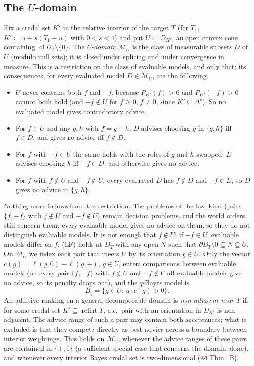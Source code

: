 \documentclass[11pt]{article}
\theoremstyle{definition}
\theoremstyle{remark}
\newcommand{\Di}{\Delta^{\circ}}
\newcommand{\M}{\mathcal M}
\newcommand{\cl}{\operatorname{cl}}
\newcommand{\relint}{\operatorname{relint}}
\newcommand{\src}[1]{\texttt{#1}}
\begin{document}
\subsection{The \texorpdfstring{$U$}{U}-domain}\label{sec:aos}
Fix a credal set $K'$ in the relative interior of the target $T$ (for $T_1$, $K'\coloneqq u+s(T_1-u)$ with $0<s<1$) and put $U\coloneqq D_{K'}$, an open convex cone containing $\cl D_T\setminus\{0\}$. The \emph{$U$-domain} $\M_U$ is the class of measurable subsets $D$ of $U$ (modulo null sets); it is closed under splicing and under convergence in measure. This is a restriction on the class of evaluable models, and only that; its consequences, for every evaluated model $D\in\M_U$, are the following.
\begin{itemize}[leftmargin=*]
\item $U$ never contains both $f$ and $-f$, because $P_{K'}(f)>0$ and $P_{K'}(-f)>0$ cannot both hold (and $-f\notin U$ for $f\ge0$, $f\ne0$, since $K'\subseteq\Di$). So no evaluated model gives contradictory advice.
\item For $f\in U$ and any $g,h$ with $f=g-h$, $D$ advises choosing $g$ in $\{g,h\}$ iff $f\in D$, and gives no advice iff $f\notin D$.
\item For $f$ with $-f\in U$ the same holds with the roles of $g$ and $h$ swapped: $D$ advises choosing $h$ iff $-f\in D$, and otherwise gives no advice.
\item For $f$ with $f\notin U$ and $-f\notin U$, every evaluated $D$ has $f\notin D$ and $-f\notin D$, so $D$ gives no advice in $\{g,h\}$.
\end{itemize}
Nothing more follows from the restriction. The problems of the last kind (pairs $\{f,-f\}$ with $f\notin U$ and $-f\notin U$) remain decision problems, and the world orders still concern them; every evaluable model gives no advice on them, so they do not distinguish evaluable models. It is not enough that $f\notin U$: if $-f\in U$, evaluable models differ on $f$. (LF) holds at $D_T$ with any open $N$ such that $\partial D_T\setminus0\subseteq N\subseteq U$. On $\M_U$ we index each pair that meets $U$ by its orientation $g\in U$. Only the vector $c(g)=\ell(g,0)-\ell(g,+)$, $g\in U$, enters comparisons between evaluable models (on every pair $\{f,-f\}$ with $f\notin U$ and $-f\notin U$ all evaluable models give no advice, so its penalty drops out), and the $q$-Bayes model is
\[
B_q=\{g\in U:\ q\cdot c(g)>0\}.
\]
An additive ranking on a general decomposable domain is \emph{non-adjacent near $T$} if, for some credal set $K'\subseteq\relint T$, a.e.\ pair with an orientation in $D_{K'}$ is non-adjacent. The advice range of such a pair may contain both acceptances; what is excluded is that they compete directly as best advice across a boundary between interior weightings. This holds on $\M_U$, whenever the advice ranges of these pairs are contained in $\{+,0\}$ (a sufficient special case that concerns the domain alone), and whenever every interior Bayes credal set is two-dimensional (\src{R4} Thm.~B).
\end{document}
